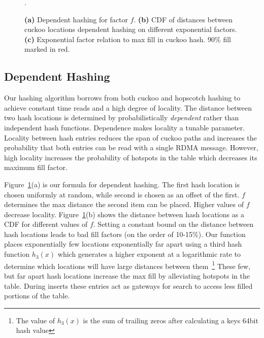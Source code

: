 \begin{figure}[t]
\begin{subfigure}{0.3\linewidth}
    \end{subfigure}.
    \vspace{-1em}
    \caption{
    \textbf{(a)} Dependent hashing for factor $f$.
    \textbf{(b)} CDF of distances between cuckoo locations dependent hashing on different exponential factors.
    \textbf{(c)} Exponential factor relation to max fill in cuckoo hash. 90\% fill marked in red.
    }
    \label{fig:locality-hashing}

\end{figure}




\subsection{Dependent Hashing}

Our hashing algorithm borrows from both cuckoo and hopscotch
hashing to achieve constant time reads and a high degree of
locality. The distance between two hash locations is
determined by probabilistically \textit{dependent} rather
than independent hash functions. Dependence makes locality a
tunable parameter. Locality between hash entries reduces the
span of cuckoo paths and increases the probability that both
entries can be read with a single RDMA message. However,
high locality increases the probability of hotspots in the
table which decreases its maximum fill factor.

Figure~\ref{fig:locality-hashing}(a) is our formula for dependent
hashing. The first hash location is chosen uniformly at
random, while second is chosen as an offset of the first.
$f$ determines the max distance the second item can be
placed. Higher values of $f$ decrease locality.
Figure~\ref{fig:locality-hashing}(b) shows the distance between hash
locations as a CDF for different values of $f$. Setting a
constant bound on the distance between hash locations leads
to bad fill factors (on the order of 10-15\%). Our function
places exponentially few locations exponentially far apart
using a third hash function $h_3(x)$ which generates a
higher exponent at a logarithmic rate to determine which
locations will have large distances between
them~\footnote{The value of $h_3(x)$ is the sum of trailing
zeros after calculating a keys 64bit hash value} These few,
but far apart hash locations increase the max fill by
alleviating hotspots in the table. During inserts these
entries act as gateways for search to access less filled
portions of the table. 


